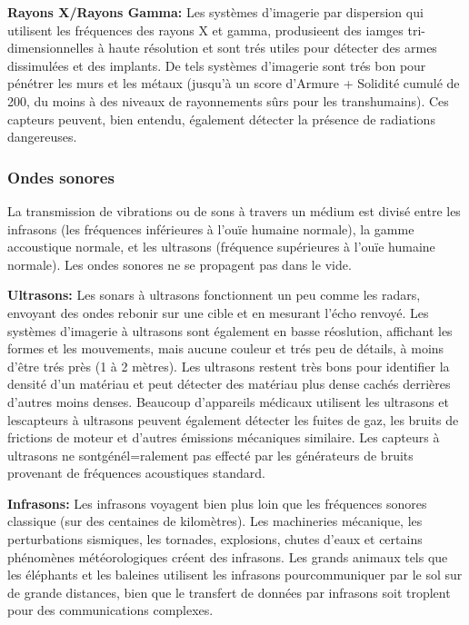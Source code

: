 \textbf{Rayons X/Rayons Gamma:} Les systèmes d'imagerie par dispersion qui utilisent les fréquences des rayons X et gamma, produsieent des iamges tri-dimensionnelles à haute résolution et sont trés utiles pour détecter des armes dissimulées et des implants. De tels systèmes d'imagerie sont trés bon pour pénétrer les murs et les métaux (jusqu'à un score d'Armure + Solidité cumulé de 200, du moins à des niveaux de rayonnements sûrs pour les transhumains). Ces capteurs peuvent, bien entendu, également détecter la présence de radiations dangereuses. 

\subsubsection{Ondes sonores} 

La transmission de vibrations ou de sons à travers un médium est divisé entre les infrasons (les fréquences inférieures à l'ouïe humaine normale), la gamme accoustique normale, et les ultrasons (fréquence supérieures à l'ouïe humaine normale). Les ondes sonores ne se propagent pas dans le vide. 

\textbf{Ultrasons:} Les sonars à ultrasons fonctionnent un peu comme les radars, envoyant des ondes rebonir sur une cible et en mesurant l'écho renvoyé. Les systèmes d'imagerie à ultrasons sont également en basse réoslution, affichant les formes et les mouvements, mais aucune couleur et trés peu de détails, à moins d'être trés près (1 à 2 mètres). Les ultrasons restent très bons pour identifier la densité d'un matériau et peut détecter des matériau plus dense cachés derrières d'autres moins denses. Beaucoup d'appareils médicaux utilisent les ultrasons et lescapteurs à ultrasons peuvent également détecter les fuites de gaz, les bruits de frictions de moteur et d'autres émissions mécaniques similaire. Les capteurs à ultrasons ne sontgénél=ralement pas effecté par les générateurs de bruits provenant de fréquences acoustiques standard. 

\textbf{Infrasons:} Les infrasons voyagent bien plus loin que les fréquences sonores classique (sur des centaines de kilomètres). Les machineries mécanique, les perturbations sismiques, les tornades, explosions, chutes d'eaux et certains phénomènes météorologiques créent des infrasons. Les grands animaux tels que les éléphants et les baleines utilisent les infrasons pourcommuniquer par le sol sur de grande distances, bien que le transfert de données par infrasons soit troplent pour des communications complexes. 

